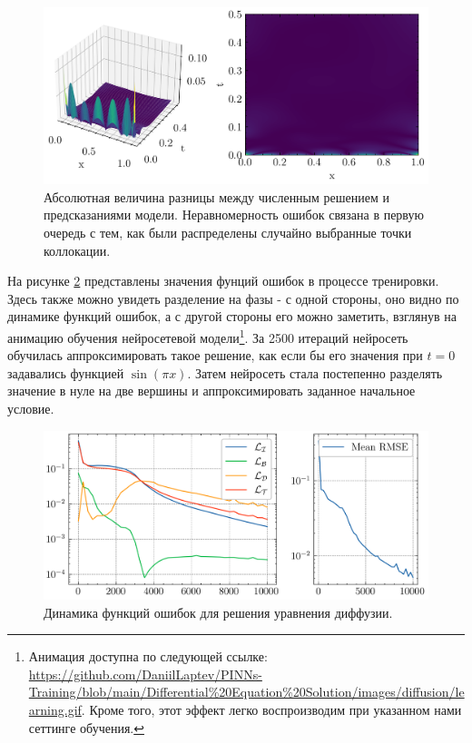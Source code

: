 \documentclass[a4paper, 12pt]{article}
\begin{document}
\begin{figure}[h]
    \centering
    \includegraphics{../Differential Equation Solution/images/diffusion/Error.png}
    \caption{Абсолютная величина разницы между численным решением и предсказаниями модели. Неравномерность ошибок связана в первую очередь с тем, как были распределены случайно выбранные точки коллокации.}
    \label{fig:diffusion:error}
\end{figure}

На рисунке \ref{fig:diffusion:losses} представлены значения фунций ошибок в процессе тренировки. Здесь также можно увидеть разделение на фазы - с одной стороны, оно видно по динамике функций ошибок, а с другой стороны его можно заметить, взглянув на анимацию обучения нейросетевой модели\footnote{Анимация доступна по следующей ссылке: \url{https://github.com/DaniilLaptev/PINNs-Training/blob/main/Differential\%20Equation\%20Solution/images/diffusion/learning.gif}. Кроме того, этот эффект легко воспроизводим при указанном нами сеттинге обучения.}. За 2500 итераций нейросеть обучилась аппроксимировать такое решение, как если бы его значения при $t=0$ задавались функцией $\sin(\pi x)$. Затем нейросеть стала постепенно разделять значение в нуле на две вершины и аппроксимировать заданное начальное условие.

\begin{figure}
    \centering
    \includegraphics{../Differential Equation Solution/images/diffusion/Loss report.png}
    \caption{Динамика функций ошибок для решения уравнения диффузии.}
    \label{fig:diffusion:losses}
\end{figure}
\end{document}
